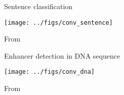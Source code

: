 \begin{frame}{Sentence classification}
  \begin{center}
    \texttt{[image: ../figs/conv\_sentence]}    
  \end{center}
  From~\cite{Kim14Convolution}
\end{frame}

\begin{frame}{Enhancer detection in DNA sequence}
  \begin{center}
    \texttt{[image: ../figs/conv\_dna]}    
  \end{center}
  From~\cite{Xu17Enhancer}
\end{frame}




